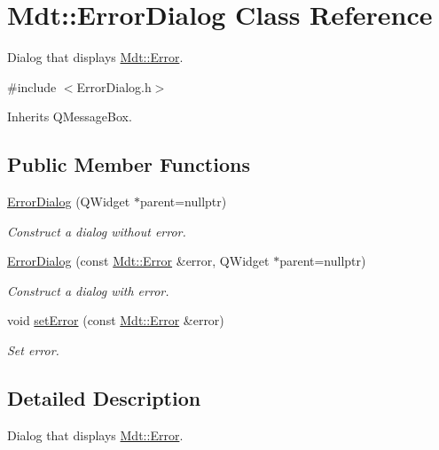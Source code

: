 \hypertarget{class_mdt_1_1_error_dialog}{}\section{Mdt\+:\+:Error\+Dialog Class Reference}
\label{class_mdt_1_1_error_dialog}


Dialog that displays \hyperlink{class_mdt_1_1_error}{Mdt\+::\+Error}.  




{\ttfamily \#include $<$Error\+Dialog.\+h$>$}



Inherits Q\+Message\+Box.

\subsection*{Public Member Functions}
\begin{DoxyCompactItemize}
\item 
\hyperlink{class_mdt_1_1_error_dialog_a75180123982c0d9261a51badd2cc8b35}{Error\+Dialog} (Q\+Widget $\ast$parent=nullptr)
\begin{DoxyCompactList}\small\item\em Construct a dialog without error. \end{DoxyCompactList}\item 
\hyperlink{class_mdt_1_1_error_dialog_a5f8bc28282e07d709cd9157bd4425d83}{Error\+Dialog} (const \hyperlink{class_mdt_1_1_error}{Mdt\+::\+Error} \&error, Q\+Widget $\ast$parent=nullptr)
\begin{DoxyCompactList}\small\item\em Construct a dialog with error. \end{DoxyCompactList}\item 
void \hyperlink{class_mdt_1_1_error_dialog_a7b946187592ea21ecefcc278b237f63b}{set\+Error} (const \hyperlink{class_mdt_1_1_error}{Mdt\+::\+Error} \&error)
\begin{DoxyCompactList}\small\item\em Set error. \end{DoxyCompactList}\end{DoxyCompactItemize}


\subsection{Detailed Description}
Dialog that displays \hyperlink{class_mdt_1_1_error}{Mdt\+::\+Error}. 

